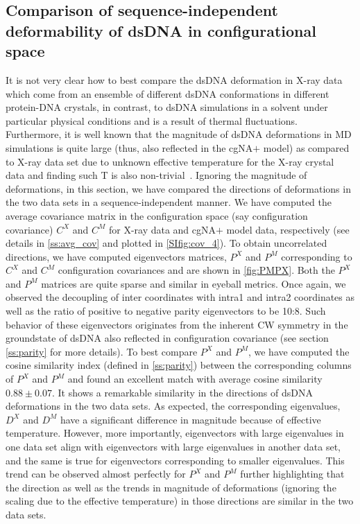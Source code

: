 \subsection{Comparison of sequence-independent deformability of dsDNA in configurational space}
It is not very clear how to best compare the dsDNA deformation in X-ray data which come from an ensemble of different dsDNA conformations in different protein-DNA crystals, in contrast, to dsDNA simulations in a solvent under particular physical conditions and is a result of thermal fluctuations.
Furthermore, it is well known that the magnitude of dsDNA deformations in MD simulations is quite large (thus, also reflected in the cgNA$+$ model)  as compared to X-ray data set due to unknown effective temperature for the X-ray crystal data and finding such T is also non-trivial~\cite{lankavs2003dna,becker2006indirect}.
Ignoring the magnitude of deformations, in this section, we have compared the directions of deformations in the two data sets in a sequence-independent manner. We have computed the average covariance matrix in the configuration space (say configuration covariance) $C^X$ and $C^M$ for X-ray data and cgNA$+$ model data, respectively (see details in \cref{ss:avg_cov} and plotted in \cref{SIfig:cov_4}).
To obtain uncorrelated directions, we have computed eigenvectors matrices, $P^X$ and $P^M$ corresponding to $C^X$ and $C^M$ configuration covariances and are shown in \cref{fig:PMPX}. Both the $P^X$ and $P^M$ matrices are quite sparse and similar in eyeball metrics. 
Once again, we observed the decoupling of inter coordinates with intra1 and intra2 coordinates as well as the ratio of positive to negative parity eigenvectors to be 10:8. Such behavior of these eigenvectors originates from the inherent CW symmetry in the groundstate of dsDNA also reflected in configuration covariance (see section \cref{ss:parity} for more details).
To best compare $P^X$ and $P^M$, we have computed the cosine similarity index (defined in \cref{ss:parity}) between the corresponding columns of $P^X$ and $P^M$ and found an excellent match with average cosine similarity $0.88 \pm 0.07$.
It shows a remarkable similarity in the directions of dsDNA deformations in the two data sets.
As expected, the corresponding eigenvalues, $D^X$ and $D^M$ have a significant difference in magnitude because of effective temperature. 
However, more importantly, eigenvectors with large eigenvalues in one data set align with eigenvectors with large eigenvalues in another data set, and the same is true for eigenvectors corresponding to smaller eigenvalues.
This trend can be observed almost perfectly for $P^X$ and $P^M$ further highlighting that the direction as well as the trends in magnitude of deformations (ignoring the scaling due to the effective temperature) in those directions are similar in the two data sets.

